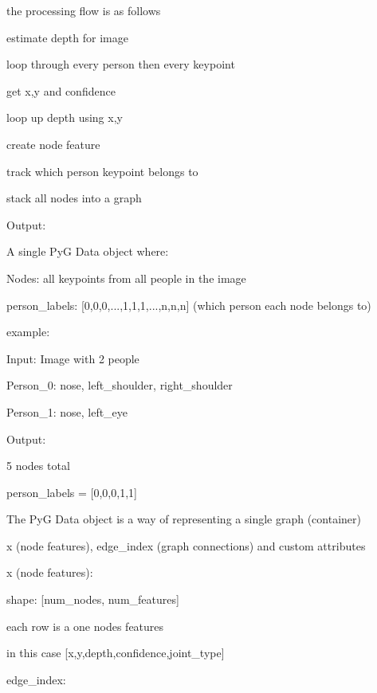 the processing flow is as follows

\begin{compactitem}
	\item estimate depth for image 
	\item loop through every person then every keypoint 
		\begin{compactitem}
			\item get x,y and confidence
			\item loop up depth using x,y
			\item create node feature
			\item track which person keypoint belongs to
		\end{compactitem}
	\item stack all nodes into a graph
\end{compactitem}

Output:

A single PyG Data object where:

Nodes: all keypoints from all people in the image

person\_labels: [0,0,0,...,1,1,1,...,n,n,n] (which person each node belongs to)

example:

Input: Image with 2 people

Person\_0: nose, left\_shoulder, right\_shoulder 

Person\_1: nose, left\_eye 

Output:

\begin{compactitem}
	\item 5 nodes total 
	\item person\_labels = [0,0,0,1,1] 
\end{compactitem}

The PyG Data object is a way of representing a single graph (container)

x (node features), edge\_index (graph connections) and custom attributes

x (node features):

\begin{compactitem}
	\item shape: [num\_nodes, num\_features] 
	\item each row is a one nodes features 
	\item in this case [x,y,depth,confidence,joint\_type]
\end{compactitem}

edge\_index: 

